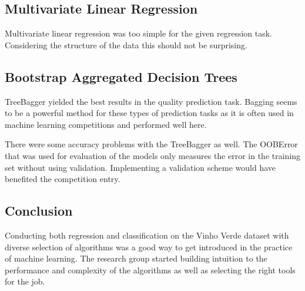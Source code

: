 \subsection{Multivariate Linear Regression}
Multivariate linear regression was too simple for the given regression task. Considering the structure of the data this should not be surprising.

\subsection{Bootstrap Aggregated Decision Trees}
TreeBagger yielded the best results in the quality prediction task. Bagging seems to be a powerful method for these types of prediction tasks as it is often used in machine learning competitions and performed well here.

There were some accuracy problems with the TreeBagger as well. The OOBError that was used for evaluation of the models only measures the error in the training set without using validation. Implementing a validation scheme would have benefited the competition entry.

\subsection{Conclusion}
Conducting both regression and classification on the Vinho Verde dataset with diverse selection of algorithms was a good way to get introduced in the practice of machine learning. The research group started building intuition to the performance and complexity of the algorithms as well as selecting the right tools for the job.

